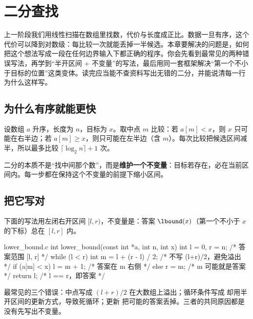 \chapter{二分查找}
\begin{overview}
上一阶段我们用线性扫描在数组里找数，代价与长度成正比。数据一旦有序，这个代价可以降到对数级：每比较一次就能丢掉一半候选。本章要解决的问题是，如何把这个想法写成一段在任何边界输入下都正确的程序。你会先看到最常见的两种错误写法，再学到``半开区间 + 不变量''的写法，最后用同一套框架解决``第一个不小于目标的位置''这类变体。读完应当能不查资料写出无错的二分，并能说清每一行为什么这样写。
\end{overview}

\section{为什么有序就能更快}
设数组 $a$ 升序，长度为 $n$，目标为 $x$。取中点 $m$ 比较：若 $a[m]<x$，则 $x$ 只可能在右半边；若 $a[m]\ge x$，则只可能在左半边（含 $m$）。每次比较把候选区间减半，所以最多比较 $\lceil\log_2 n\rceil+1$ 次。

\begin{keypoint}
二分的本质不是``找中间那个数''，而是\textbf{维护一个不变量}：目标若存在，必在当前区间内。每一步都在保持这个不变量的前提下缩小区间。
\end{keypoint}

\section{把它写对}
下面的写法用左闭右开区间 $[l,r)$，不变量是：答案 $\nonote{\lbound}(x)$（第一个不小于 $x$ 的下标）总在 $[l,r]$ 内。

\begin{code}{lower\_bound.c}
int lower_bound(const int *a, int n, int x) {
    int l = 0, r = n;                 /* 答案范围 [l, r] */
    while (l < r) {
        int m = l + (r - l) / 2;      /* 不写 (l+r)/2，避免溢出 */
        if (a[m] < x) l = m + 1;      /* 答案在 m 右侧 */
        else          r = m;          /* m 可能就是答案 */
    }
    return l;                         /* l == r，即答案 */
}
\end{code}

\begin{pitfall}
最常见的三个错误：中点写成 $(l+r)/2$ 在大数组上溢出；循环条件写成  却用半开区间的更新方式，导致死循环；更新  把可能的答案丢掉。三者的共同原因都是没有先写出不变量。
\end{pitfall}

